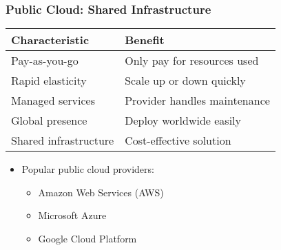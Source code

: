 \documentclass{beamer}
\begin{document}
\begin{frame}
    \frametitle{Public Cloud: Shared Infrastructure}
    
    \begin{tabular}{|p{}|p{}|}
        \hline
        \textbf{Characteristic} & \textbf{Benefit} \\
        \hline
        Pay-as-you-go & Only pay for resources used \\
        \hline
        Rapid elasticity & Scale up or down quickly \\
        \hline
        Managed services & Provider handles maintenance \\
        \hline
        Global presence & Deploy worldwide easily \\
        \hline
        Shared infrastructure & Cost-effective solution \\
        \hline
    \end{tabular}
    
    \begin{itemize}
        \item Popular public cloud providers:
        \begin{itemize}
            \item Amazon Web Services (AWS)
            \item Microsoft Azure
            \item Google Cloud Platform
        \end{itemize}
    \end{itemize}
\end{frame}
\end{document}
